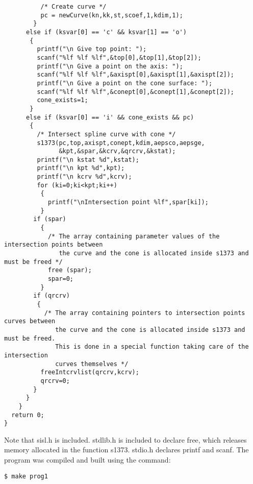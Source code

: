 \begin{verbatim}
          /* Create curve */
          pc = newCurve(kn,kk,st,scoef,1,kdim,1);
        }
      else if (ksvar[0] == 'c' && ksvar[1] == 'o')
       {
         printf("\n Give top point: ");
         scanf("%lf %lf %lf",&top[0],&top[1],&top[2]);
         printf("\n Give a point on the axis: ");
         scanf("%lf %lf %lf",&axispt[0],&axispt[1],&axispt[2]);
         printf("\n Give a point on the cone surface: ");
         scanf("%lf %lf %lf",&conept[0],&conept[1],&conept[2]);
         cone_exists=1;
       }
      else if (ksvar[0] == 'i' && cone_exists && pc)
       {
         /* Intersect spline curve with cone */
         s1373(pc,top,axispt,conept,kdim,aepsco,aepsge,
               &kpt,&spar,&kcrv,&qrcrv,&kstat);
         printf("\n kstat %d",kstat);
         printf("\n kpt %d",kpt);
         printf("\n kcrv %d",kcrv);
         for (ki=0;ki<kpt;ki++)
          {
            printf("\nIntersection point %lf",spar[ki]);
          }
        if (spar)
          {
            /* The array containing parameter values of the intersection points between
               the curve and the cone is allocated inside s1373 and must be freed */
            free (spar);
            spar=0;
          }
        if (qrcrv)
         {
           /* The array containing pointers to intersection points curves between
              the curve and the cone is allocated inside s1373 and must be freed.
              This is done in a special function taking care of the intersection
              curves themselves */
          freeIntcrvlist(qrcrv,kcrv);
          qrcrv=0;
        }
      }
    }
  return 0;
}

\end{verbatim}
Note that sisl.h is included. stdlib.h is included to declare free, which
releases memory allocated in the function s1373. stdio.h declares printf and
scanf.
\vfill
\newpage
The program was compiled and built using the command:
\begin{verbatim}
$ make prog1
\end{verbatim}


